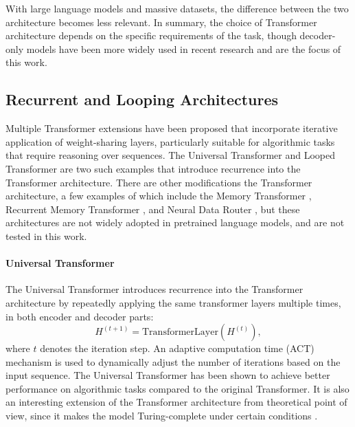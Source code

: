 With large language models and massive datasets, the difference between the two architecture becomes less relevant. In summary, the choice of Transformer architecture depends on the specific requirements of the task, though decoder-only models have been more widely used in recent research and are the focus of this work.

\subsection{Recurrent and Looping Architectures}\label{subsec:recurrent_looping}

Multiple Transformer extensions have been proposed that incorporate iterative application of weight-sharing layers, particularly suitable for algorithmic tasks that require reasoning over sequences. The Universal Transformer and Looped Transformer are two such examples that introduce recurrence into the Transformer architecture. There are other modifications the Transformer architecture, a few examples of which include the Memory Transformer \parencite{burtsev_memory_2021}, Recurrent Memory Transformer \parencite{bulatov_recurrent_2022}, and Neural Data Router \parencite{csordas_neural_2021}, but these architectures are not widely adopted in pretrained language models, and are not tested in this work.

\paragraph{Universal Transformer}
The Universal Transformer \parencite{dehghani_universal_2018} introduces recurrence into the Transformer architecture by repeatedly applying the same transformer layers multiple times, in both encoder and decoder parts:
\begin{equation*}
    H^{(t+1)} = \text{TransformerLayer}(H^{(t)}),
\end{equation*}
where $t$ denotes the iteration step. An adaptive computation time (ACT) mechanism is used to dynamically adjust the number of iterations based on the input sequence. The Universal Transformer has been shown to achieve better performance on algorithmic tasks compared to the original Transformer. It is also an interesting extension of the Transformer architecture from theoretical point of view, since it makes the model Turing-complete under certain conditions \parencite{dehghani_universal_2018}.

